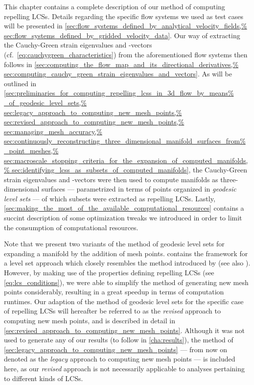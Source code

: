 This chapter contains a complete description of our method of computing
repelling LCSs. Details regarding the specific flow systems we used as test
cases will be presented in
\cref{sec:flow_systems_defined_by_analytical_velocity_fields,%
sec:flow_systems_defined_by_gridded_velocity_data}. Our way of extracting
the Cauchy-Green strain eigenvalues and -vectors (cf.\
\cref{eq:cauchygreen_characteristics}) from the aforementioned flow systems
then follows in
\cref{sec:computing_the_flow_map_and_its_directional_derivatives,%
sec:computing_cauchy_green_strain_eigenvalues_and_vectors}. As will be outlined
in \cref{sec:preliminaries_for_computing_repelling_lcss_in_3d_flow_by_means%
_of_geodesic_level_sets,%
sec:legacy_approach_to_computing_new_mesh_points,%
sec:revised_approach_to_computing_new_mesh_points,%
sec:managing_mesh_accuracy,%
sec:continuously_reconstructing_three_dimensional_manifold_surfaces_from%
_point_meshes,%
sec:macroscale_stopping_criteria_for_the_expansion_of_computed_manifolds,%
sec:identifying_lcss_as_subsets_of_computed_manifolds}, the Cauchy-Green
strain eigenvalues and -vectors were then used to compute manifolds as
three-dimensional surfaces --- parametrized in terms of points organized in
\emph{geodesic level sets} --- of which subsets were extracted as repelling
LCSs. Lastly,
\cref{sec:making_the_most_of_the_available_computational_resources} contains a
succint description of some optimization tweaks we introduced in order to limit
the consumption of computational resources.

Note that we present two variants of the method of geodesic level sets for
expanding a manifold by the addition of mesh points.
 contains the framework
for a level set approach which closely resembles the method introduced by
\textcite{krauskopf2005survey} (see also \textcite{krauskopf2003computing}).
However, by making use of the properties defining repelling LCSs (see
\cref{eq:lcs_conditions}), we were able to simplify the method of generating
new mesh points considerably, resulting in a great speedup in terms of
computation runtimes. Our adaption of the method of geodesic level sets for the
specific case of repelling LCSs will hereafter be referred to as the
\emph{revised} approach to computing new mesh points, and is described in detail
in \cref{sec:revised_approach_to_computing_new_mesh_points}. Although it was
not used to generate any of our results (to follow in \cref{cha:results}), the
method of \cref{sec:legacy_approach_to_computing_new_mesh_points} --- from now
on denoted as the \emph{legacy} approach to computing new mesh points ---
is included here, as our \emph{revised} approach is not necessarily applicable
to analyses pertaining to different kinds of LCSs.


